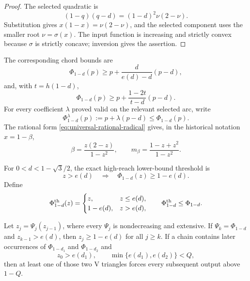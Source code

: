 \begin{proof}
The selected quadratic is
\[
 (1-q)(q-d)=(1-d)^2\nu(2-\nu).
\]
Substitution gives $x(1-x)=\nu(2-\nu)$, and the selected component uses the
smaller root $\nu=\sigma(x)$.  The input function is increasing and strictly
convex because $\sigma$ is strictly concave; inversion gives the assertion.
\end{proof}

The corresponding chord bounds are
\begin{equation}
 \Phi_{1-d}(p)
 \ge p+\frac{d}{e(d)-d}(p-d),
 \label{eq:reader-high-chord}
\end{equation}
and, with $t=h(1-d)$,
\begin{equation}
 \Phi_{1-d}(p)
 \ge p+\frac{1-2t}{t-d}(p-d).
 \label{eq:reader-low-chord}
\end{equation}
For every coefficient $\lambda$ proved valid on the relevant selected arc,
write
\begin{equation}
 \Phi_{1-d}^{\lambda}(p)
 :=p+\lambda(p-d)
 \le\Phi_{1-d}(p).
 \label{eq:reader-affine-relaxation}
\end{equation}
The rational form \eqref{eq:universal-rational-radical} gives, in the
historical notation $x=1-\beta$,
\begin{equation}
 \beta=\frac{z(2-z)}{1-z^2},
 \qquad
 m_\beta=\frac{1-z+z^2}{1-z^2}.
 \label{eq:reader-beta-rational}
\end{equation}

For $0<d<1-\sqrt3/2$, the exact high-reach lower-bound threshold is
\begin{equation}
 z>e(d)
 \quad\Longrightarrow\quad
 \Phi_{1-d}(z)\ge1-e(d).
 \label{eq:reader-high-threshold}
\end{equation}
Define
\begin{equation}
 \Phi_{1-d}^{\rm th}(z)=
 \begin{cases}
  z,&z\le e(d),\\
  1-e(d),&z>e(d),
 \end{cases}
 \qquad
 \Phi_{1-d}^{\rm th}\le\Phi_{1-d}.
 \label{eq:reader-threshold-transfer}
\end{equation}

\begin{lemma}
\label{lem:reader-threshold-routing}
Let $z_j=\Psi_j(z_{j-1})$, where every $\Psi_j$ is nondecreasing and extensive.
If $\Psi_k=\Phi_{1-d}$ and $z_{k-1}>e(d)$, then
$z_j\ge1-e(d)$ for all $j\ge k$.  If a chain contains later occurrences of
$\Phi_{1-d_1}$ and $\Phi_{1-d_2}$ and
\[
 z_0>e(d_1),
 \qquad
 \min\{e(d_1),e(d_2)\}<Q,
\]
then at least one of those two V triangles forces every subsequent output above
$1-Q$.
\end{lemma}

